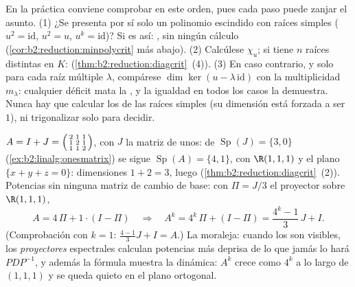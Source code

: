 \begin{method}\label{met:b2:reduction:decide}
En la práctica conviene comprobar en este orden, pues cada paso
puede zanjar el asunto. (1) ¿Se presenta por sí solo un polinomio
 escindido con raíces simples ($u^2 = \mathrm{id}$, $u^2 =
u$, $u^k = \mathrm{id}$)? Si es así: , sin ningún
cálculo (\cref{cor:b2:reduction:minpolycrit} más abajo). (2)
Calcúlese $\chi_u$; si tiene $n$ raíces distintas en $K$:
 (\cref{thm:b2:reduction:diagcrit}~(4)). (3) En caso
contrario, y solo para cada raíz múltiple $\lambda$, compárese
$\dim\ker(u - \lambda\,\mathrm{id})$ con la multiplicidad
$m_\lambda$: cualquier déficit mata la , y la
igualdad en todos los casos la demuestra. Nunca hay que calcular
los  de las raíces simples (su dimensión está
forzada a ser $1$), ni trigonalizar solo para decidir.
\end{method}

\begin{example}\label{ex:b2:reduction:diagwork}
$A = I + J = \begin{psmallmatrix}2 & 1 & 1\\ 1 & 2 & 1\\ 1 & 1 &
2\end{psmallmatrix}$, con $J$ la matriz de unos: de
$\operatorname{Sp}(J) = \{3, 0\}$
(\cref{ex:b2:linalg:onesmatrix}) se sigue $\operatorname{Sp}(A) =
\{4, 1\}$, con  $\R(1,1,1)$ y el plano $\{x + y
+ z = 0\}$: dimensiones $1 + 2 = 3$, luego 
(\cref{thm:b2:reduction:diagcrit}~(2)). Potencias sin ninguna matriz
de cambio de base: con $\Pi = J/3$ el proyector sobre $\R(1,1,1)$,
\[
A = 4\,\Pi + 1\cdot(I - \Pi)
\quad\Longrightarrow\quad
A^k = 4^k\,\Pi + (I - \Pi)
= \frac{4^k - 1}{3}\,J + I .
\]
(Comprobación con $k = 1$: $\frac{4-1}3 J + I = A$.) La moraleja:
cuando los  son visibles, los \emph{proyectores}
espectrales calculan potencias más deprisa de lo que jamás lo hará
$PDP^{-1}$, y además la fórmula muestra la dinámica: $A^k$ crece como
$4^k$ a lo largo de $(1,1,1)$ y se queda quieto en el plano
ortogonal.
\end{example}

